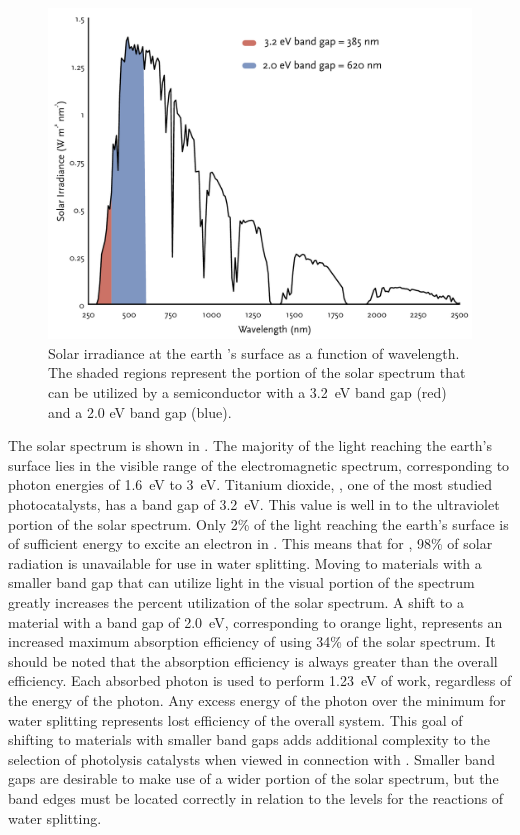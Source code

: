 \begin{figure}
	\includegraphics[width=\textwidth]{solarspectrum.pdf}
	\caption[Solar irradiance at the earth 's surface]{%
		Solar irradiance at the earth 's surface as a function of 
		wavelength. The shaded regions represent the portion of the 
		solar spectrum that can be utilized by a semiconductor with a 
		3.2~eV band gap (red) and a 2.0 eV band gap (blue).\cite{Anonymous:jk}}
	\label{fig:solarspectrum}
\end{figure}

The solar spectrum is shown in . The majority of the light
reaching the earth's surface lies in the visible range of the electromagnetic spectrum,
corresponding to photon energies of 1.6~eV to 3~eV. Titanium dioxide, , one of
the most studied photocatalysts, has a band gap of 3.2~eV. This value is well in to the
ultraviolet portion of the solar spectrum. Only 2\% of the light reaching the earth's
surface is of sufficient energy to excite an electron in . This means that for
, 98\% of solar radiation is unavailable for use in water splitting. Moving to
materials with a smaller band gap that can utilize light in the visual portion of the
spectrum greatly increases the percent utilization of the solar spectrum. A shift to a
material with a band gap of 2.0~eV, corresponding to orange light, represents an increased
maximum absorption efficiency of using 34\% of the solar spectrum. It should be noted that
the absorption efficiency is always greater than the overall efficiency. Each absorbed
photon is used to perform 1.23~eV of work, regardless of the energy of the photon. Any
excess energy of the photon over the minimum for water splitting represents lost
efficiency of the overall system. This goal of shifting to materials with smaller band
gaps adds additional complexity to the selection of photolysis catalysts when viewed in
connection with . Smaller band gaps are desirable to make use of
a wider portion of the solar spectrum, but the band edges must be located correctly in
relation to the levels for the reactions of water splitting.

